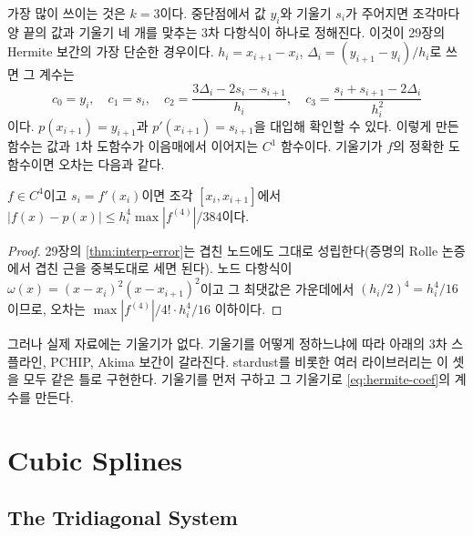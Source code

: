 가장 많이 쓰이는 것은 $k=3$이다. 중단점에서 값 $y_i$와 기울기 $s_i$가 주어지면 조각마다 양 끝의 값과 기울기 네 개를 맞추는 3차 다항식이 하나로 정해진다. 이것이 29장의 Hermite 보간의 가장 단순한 경우이다. $h_i=x_{i+1}-x_i$, $\Delta_i=(y_{i+1}-y_i)/h_i$로 쓰면 그 계수는
\begin{equation}
\label{eq:hermite-coef}
c_0=y_i,\quad c_1=s_i,\quad c_2=\frac{3\Delta_i-2s_i-s_{i+1}}{h_i},\quad c_3=\frac{s_i+s_{i+1}-2\Delta_i}{h_i^2}
\end{equation}
이다. $p(x_{i+1})=y_{i+1}$과 $p'(x_{i+1})=s_{i+1}$을 대입해 확인할 수 있다. 이렇게 만든 함수는 값과 1차 도함수가 이음매에서 이어지는 $C^1$ 함수이다. 기울기가 $f$의 정확한 도함수이면 오차는 다음과 같다.

\begin{proposition}
\label{prop:hermite-error}
$f\in C^4$이고 $s_i=f'(x_i)$이면 조각 $[x_i,x_{i+1}]$에서 $|f(x)-p(x)|\le h_i^4\max|f^{(4)}|/384$이다.
\end{proposition}

\begin{proof}
29장의 \cref{thm:interp-error}는 겹친 노드에도 그대로 성립한다(증명의 Rolle 논증에서 겹친 근을 중복도대로 세면 된다). 노드 다항식이 $\omega(x)=(x-x_i)^2(x-x_{i+1})^2$이고 그 최댓값은 가운데에서 $(h_i/2)^4=h_i^4/16$이므로, 오차는 $\max|f^{(4)}|/4!\cdot h_i^4/16$ 이하이다.
\end{proof}

그러나 실제 자료에는 기울기가 없다. 기울기를 어떻게 정하느냐에 따라 아래의 3차 스플라인, PCHIP, Akima 보간이 갈라진다. stardust를 비롯한 여러 라이브러리는 이 셋을 모두 같은 틀로 구현한다. 기울기를 먼저 구하고 그 기울기로 \eqref{eq:hermite-coef}의 계수를 만든다.

\section{Cubic Splines}
\label{sec:cubic-spline}

\subsection{The Tridiagonal System}

